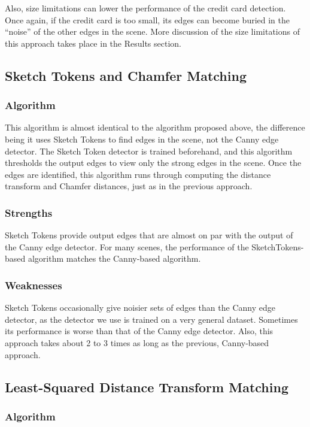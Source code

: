 \documentclass[10pt,twocolumn,letterpaper]{article}
\begin{document}
Also, size limitations can lower the performance of the credit card detection. Once again, if the credit card is too small, its edges can become buried in the “noise” of the other edges in the scene. More discussion of the size limitations of this approach takes place in the Results section.

\subsection{Sketch Tokens and Chamfer Matching}
\subsubsection{Algorithm}

	This algorithm is almost identical to the algorithm proposed above, the difference being it uses Sketch Tokens to find edges in the scene, not the Canny edge detector. The Sketch Token detector is trained beforehand, and this algorithm thresholds the output edges to view only the strong edges in the scene. Once the edges are identified, this algorithm runs through computing the distance transform and Chamfer distances, just as in the previous approach.
\subsubsection{Strengths}

	Sketch Tokens provide output edges that are almost on par with the output of the Canny edge detector. For many scenes, the performance of the SketchTokens-based algorithm matches the Canny-based algorithm.
\subsubsection{Weaknesses}

	Sketch Tokens occasionally give noisier sets of edges than the Canny edge detector, as the detector we use is trained on a very general dataset. Sometimes its performance is worse than that of the Canny edge detector. Also, this approach takes about 2 to 3 times as long as the previous, Canny-based approach. 

\subsection{Least-Squared Distance Transform Matching}
\subsubsection{Algorithm}
\end{document}
